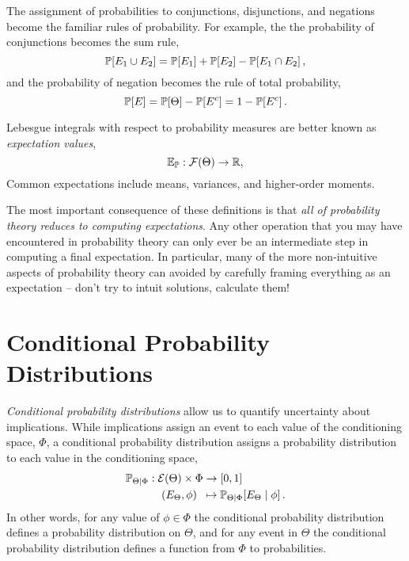 The assignment of probabilities to conjunctions, disjunctions, and 
negations become the familiar rules of probability.  For example, the
the probability of conjunctions becomes the sum rule,
%
\begin{equation*}
\mathbb{P} \! \left[ E_{1} \cup E_{2} \right]
= 
\mathbb{P} \! \left[ E_{1} \right] + \mathbb{P} \! \left[ E_{2} \right] 
- \mathbb{P} \! \left[ E_{1} \cap E_{2} \right],
\end{equation*}
%
and the probability of negation becomes the rule of total probability,
%
\begin{equation*}
\mathbb{P} \! \left[ E \right] 
= 
\mathbb{P} \! \left[ \Theta \right] - \mathbb{P} \! \left[ E^{c} \right]
=
1 - \mathbb{P} \! \left[ E^{c} \right].
\end{equation*}

Lebesgue integrals with respect to probability measures are better
known as \emph{expectation values},
%
\begin{equation*}
\mathbb{E}_{\mathbb{P}} : \mathcal{F} \! \left( \Theta \right) \rightarrow \mathbb{R},
\end{equation*}
%
Common expectations include means, variances, and higher-order moments.

The most important consequence of these definitions is that \emph{all of 
probability theory reduces to computing expectations}.  Any other operation 
that you may have encountered in probability theory can only ever be an
intermediate step in computing a final expectation.  In particular, many of 
the more non-intuitive aspects of probability theory can avoided by carefully
framing everything as an expectation -- don't try to intuit solutions, calculate 
them!

\section{Conditional Probability Distributions}

\emph{Conditional probability distributions} allow us to quantify uncertainty
about implications.  While implications assign an event to each value of the 
conditioning space, $\Phi$, a conditional probability distribution assigns a 
probability distribution to each value in the conditioning space,
%
\begin{align*}
\mathbb{P}_{\Theta \mid \Phi} 
&:  \mathcal{E} \! \left( \Theta \right)  \times \Phi \rightarrow \left[0, 1 \right] \\
&\quad \left( E_{\Theta}, \phi \right) \;\; \mapsto 
\mathbb{P}_{\Theta \mid \Phi} \! \left[ E_{\Theta} \mid \phi \right].
\end{align*}
%
In other words, for any value of $\phi \in \Phi$ the conditional probability
distribution defines a probability distribution on $\Theta$, and for any
event in $\Theta$ the conditional probability distribution defines a 
function from $\Phi$ to probabilities.  

